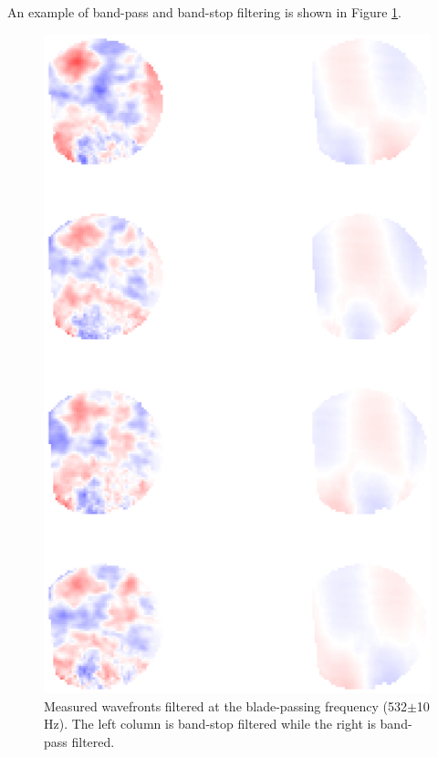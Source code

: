 % 

An example of band-pass and band-stop filtering is shown in Figure \ref{fig:06_filter_temporal_bandpass}.
\begin{figure}
 \centering
 \includegraphics{../matlab/06_single_sensor_filtering/filter_temporal_bandpass.eps}
 \caption{Measured wavefronts filtered at the blade-passing frequency (532$\pm$10 Hz).  The left column is band-stop filtered while the right is band-pass filtered.}
 \label{fig:06_filter_temporal_bandpass}
\end{figure}
